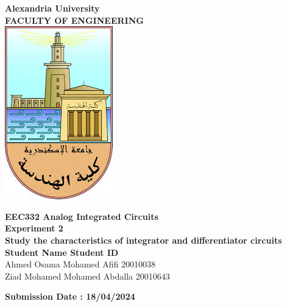 \documentclass[a4paper, 12pt, english]{article}
\begin{document}
\begin{titlepage}
\begin{center}
\textbf{\LARGE Alexandria University}\\[0.5cm] 
\textbf{\large FACULTY OF ENGINEERING}\\[0.2cm]
\vspace{20pt}
\includegraphics{logo.png}\\[1cm]
\par
\vspace{20pt}
\textbf{\Large EEC332 Analog Integrated Circuits}\\
\vspace{15pt}
\myrule[1pt][7pt]
\textbf{\LARGE  Experiment 2}\\
\vspace{15pt}
\textbf{\large Study the characteristics of integrator and differentiator circuits}\\
\myrule[1pt][7pt]
\vspace{25pt}
\textbf{\large \hspace{50pt}Student Name \hspace{60pt} Student ID}\\
Ahmed Osama Mohamed Afifi \hspace{60pt} 20010038 \\
Ziad Mohamed Mohamed Abdalla \hspace{40pt} 20010643 \\

\vspace{45pt}
\end{center}

\par
\vfill
\begin{center}
\textbf{Submission Date : 18/04/2024}\\
\end{center}

\end{titlepage}
\end{document}
